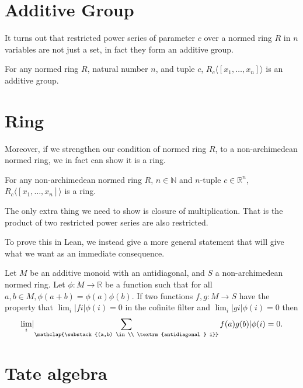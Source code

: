 \section{Additive Group}

It turns out that restricted power series of parameter $c$ over a normed ring $R$ in $n$ variables
are not just a set, in fact they form an additive group.

\begin{lemma}
  For any normed ring $R$, natural number $n$, and tuple $c$,
  $R_c \langle \! [ x_1, \dots, x_n ] \! \rangle$ is an additive group.
\end{lemma}

\section{Ring}

Moreover, if we strengthen our condition of normed ring $R$, to a non-archimedean normed ring, we
in fact can show it is a ring.

\begin{theorem}
  For any non-archimedean normed ring $R$, $n \in \mathbb{N}$ and $n$-tuple $c \in \mathbb{R}^n$,
  $R_c \langle \! [ x_1, \dots, x_n ] \! \rangle$ is a ring.
\end{theorem}

The only extra thing we need to show is closure of multiplication. That is the product of two restricted
power series are also restricted.

To prove this in Lean, we instead give a more general statement that will give what we want as an
immediate consequence.

\begin{lemma}
  Let $M$ be an additive monoid with an antidiagonal, and $S$ a non-archimedean normed ring. Let
  $\phi : M \to \mathbb{R}$ be a function such that for all $a, b \in M, \phi(a + b) = \phi(a)
  \phi(b)$. If two functions $f, g : M \to S$ have the property that
  $\lim_i \lvert f i \rvert \phi (i) = 0$ in the cofinite filter and
  $\lim_i \lvert g i \rvert \phi (i) = 0$ then
  \[
  \lim_i \lvert \sum_{\mathclap{\substack{(a,b) \in \\ \textrm{antidiagonal } i}}} f(a) g(b) \rvert
  \phi(i) = 0.
  \]
\end{lemma}

\section{Tate algebra}

